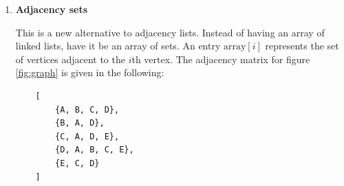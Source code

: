 \documentclass[a4paper,11pt]{book}
\begin{document}
\begin{enumerate}
    \noindent In adjacency lists, an array of lists is used to represent the graph. The size of the array is equal to the number of vertices. An entry $\text{array}[i]$ represents the list of vertices adjacent to the $i$th vertex. This representation can also be used to represent a weighted graph. The weights of edges can be represented as lists of pairs. The adjacency matrix for figure \ref{fig:graph} is given in the following:
    \begin{lstlisting}
    A ---> B ---> C ---> D ---> Null
    B ---> A ---> D ---> Null
    C ---> A ---> D ---> E ---> Null
    D ---> A ---> B ---> C ---> E ---> Null
    E ---> C ---> D ---> Null
    \end{lstlisting}
    \item \textbf{Adjacency sets}
    
    \noindent This is a new alternative to adjacency lists. Instead of having an array of linked lists, have it be an array of sets. An entry $\text{array}[i]$ represents the set of vertices adjacent to the $i$th vertex. The adjacency matrix for figure \ref{fig:graph} is given in the following:
    \begin{lstlisting}
    [
        {A, B, C, D}, 
        {B, A, D}, 
        {C, A, D, E}, 
        {D, A, B, C, E}, 
        {E, C, D}
    ]
    \end{lstlisting}
\end{enumerate}
\end{document}
